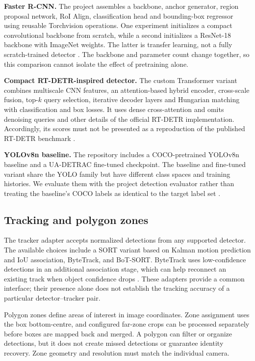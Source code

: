 \textbf{Faster R-CNN.} The project assembles a backbone, anchor generator, region proposal network, RoI Align, classification head and bounding-box regressor using reusable Torchvision operations. One experiment initializes a compact convolutional backbone from scratch, while a second initializes a ResNet-18 backbone with ImageNet weights. The latter is transfer learning, not a fully scratch-trained detector \cite{faster,architecture}. The backbone and parameter count change together, so this comparison cannot isolate the effect of pretraining alone.

\textbf{Compact RT-DETR-inspired detector.} The custom Transformer variant combines multiscale CNN features, an attention-based hybrid encoder, cross-scale fusion, top-$k$ query selection, iterative decoder layers and Hungarian matching with classification and box losses. It uses dense cross-attention and omits denoising queries and other details of the official RT-DETR implementation. Accordingly, its scores must not be presented as a reproduction of the published RT-DETR benchmark \cite{rtdetr,rtdetrcode}.

\textbf{YOLOv8n baseline.} The repository includes a COCO-pretrained YOLOv8n baseline and a UA-DETRAC fine-tuned checkpoint. The baseline and fine-tuned variant share the YOLO family but have different class spaces and training histories. We evaluate them with the project detection evaluator rather than treating the baseline's COCO labels as identical to the target label set \cite{yolo,evaluationcode}.

\subsection{Tracking and polygon zones}
The tracker adapter accepts normalized detections from any supported detector. The available choices include a SORT variant based on Kalman motion prediction and IoU association, ByteTrack, and BoT-SORT. ByteTrack uses low-confidence detections in an additional association stage, which can help reconnect an existing track when object confidence drops \cite{sort,bytetrack,botsort}. These adapters provide a common interface; their presence alone does not establish the tracking accuracy of a particular detector--tracker pair.

Polygon zones define areas of interest in image coordinates. Zone assignment uses the box bottom-centre, and configured far-zone crops can be processed separately before boxes are mapped back and merged. A polygon can filter or organize detections, but it does not create missed detections or guarantee identity recovery. Zone geometry and resolution must match the individual camera.

